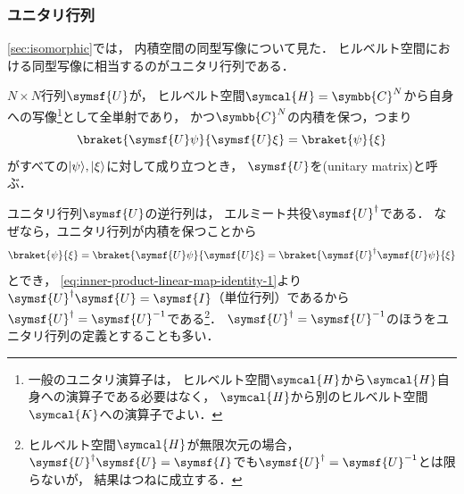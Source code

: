 \documentclass[
]{sotsu}
\begin{document}
\subsubsection{ユニタリ行列}

\cref{sec:isomorphic}では，
内積空間の同型写像について見た．
ヒルベルト空間における同型写像に相当するのがユニタリ行列である．

$N \times N$行列$\symsf{U}$が，
ヒルベルト空間$\symcal{H} = \symbb{C}^N$から自身への写像\footnote{
    一般のユニタリ演算子は，
    ヒルベルト空間$\symcal{H}$から$\symcal{H}$自身への演算子である必要はなく，
    $\symcal{H}$から別のヒルベルト空間$\symcal{K}$への演算子でよい．
}として全単射であり，
かつ$\symbb{C}^N$の内積を保つ，つまり
\begin{equation*}
    \braket{\symsf{U} \psi}{\symsf{U} \xi}
    = \braket{\psi}{\xi}
\end{equation*}
がすべての$\lvert\psi\rangle, \lvert\xi\rangle$に対して成り立つとき，
$\symsf{U}$を(unitary matrix)と呼ぶ．

ユニタリ行列$\symsf{U}$の逆行列は，
エルミート共役$\adjoint{\symsf{U}}$である．
なぜなら，ユニタリ行列が内積を保つことから
\begin{equation*}
    \braket{\psi}{\xi}
    = \braket{\symsf{U} \psi}{\symsf{U} \xi}
    = \braket{\adjoint{\symsf{U}} \symsf{U} \psi}{\xi}
\end{equation*}
とでき，
\cref{eq:inner-product-linear-map-identity-1}より$\adjoint{\symsf{U}} \symsf{U} = \symsf{I}$（単位行列）であるから$\adjoint{\symsf{U}} = \symsf{U}^{-1}$である\footnote{
    ヒルベルト空間$\symcal{H}$が無限次元の場合，
    $\adjoint{\symsf{U}} \symsf{U} = \symsf{I}$でも$\adjoint{\symsf{U}} = \symsf{U}^{-1}$とは限らないが，
    結果はつねに成立する．
}．
$\adjoint{\symsf{U}} = \symsf{U}^{-1}$のほうをユニタリ行列の定義とすることも多い．
\end{document}
